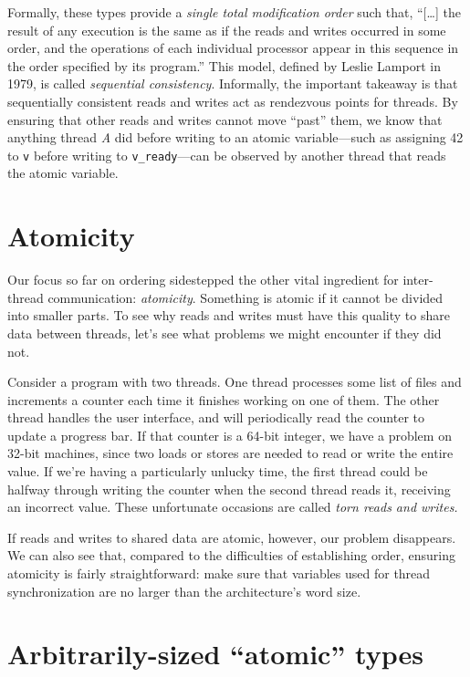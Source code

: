 \documentclass[fontsize=10pt, numbers=endperiod]{scrartcl}
\newcommand{\monobox}[1]{\mbox{\texttt{#1}}}
\newcommand{\introduce}[1]{\textit{#1}}
\begin{document}
\begin{multicols*}{2}
Formally, these types provide a \textit{single total modification order}
such that,
``[\ldots] the result of any execution is the same as if the reads and writes
occurred in some order, and the operations of each individual
processor appear in this sequence in the order specified by its program.''
This model, defined by Leslie Lamport in 1979,
is called \introduce{sequential consistency}.
Informally, the important takeaway is that sequentially consistent reads
and writes act as rendezvous points for threads.
By ensuring that other reads and writes cannot move ``past'' them,
we know that anything thread \textit{A} did before writing to an atomic
variable---such as assigning 42 to \texttt{v} before writing to
\monobox{v\_ready}---can be observed by another thread that reads the
atomic variable.

\section{Atomicity}
\label{atomicity}

Our focus so far on ordering sidestepped the other vital ingredient for
inter-thread communication: \introduce{atomicity}.
Something is atomic if it cannot be divided into smaller parts.
To see why reads and writes must have this quality to share data between threads,
let's see what problems we might encounter if they did not.

Consider a program with two threads.
One thread processes some list of files
and increments a counter each time it finishes working on one of them.
The other thread handles the user interface, and will periodically read
the counter to update a progress bar.
If that counter is a 64-bit integer, we have a problem on 32-bit machines,
since two loads or stores are needed to read or write the entire value.
If we're having a particularly unlucky time,
the first thread could be halfway through writing the counter
when the second thread reads it, receiving an incorrect value.
These unfortunate occasions are called \introduce{torn reads and writes.}

If reads and writes to shared data are atomic, however,
our problem disappears.
We can also see that, compared to the difficulties of establishing order,
ensuring atomicity is fairly straightforward:
make sure that variables used for thread synchronization are no larger than
the architecture's word size.

\section{Arbitrarily-sized “atomic” types}


\end{multicols*}
\end{document}
